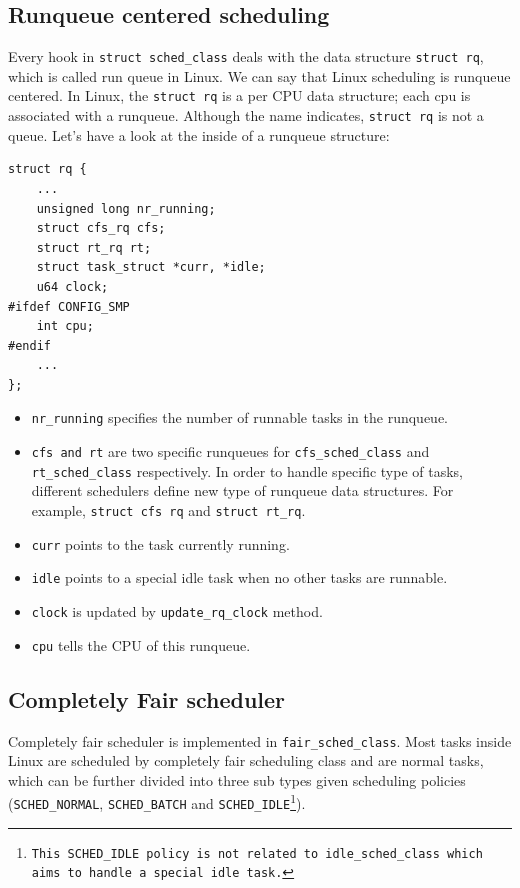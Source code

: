 \subsection{Runqueue centered scheduling\label{LinuxSched_rq}}
Every hook in \texttt{struct sched\_class} deals with the data structure 
\texttt{struct rq}, which is called run queue in Linux.  We can say that 
Linux scheduling is runqueue centered. In Linux, the \texttt{struct rq} is 
a per CPU data structure; each cpu is associated with a runqueue. Although 
the name indicates, \texttt{struct rq} is not a queue. Let's have a look at 
the inside of a runqueue structure:
\begin{lstlisting}
struct rq {
	...
	unsigned long nr_running;
	struct cfs_rq cfs;
	struct rt_rq rt;
	struct task_struct *curr, *idle;
	u64 clock;
#ifdef CONFIG_SMP
	int cpu;
#endif
	...
};
\end{lstlisting}
\begin{itemize}
\item \texttt{nr\_running} specifies the number of runnable tasks in the
	runqueue.
\item \texttt{cfs and rt} are two specific runqueues for 
	\texttt{cfs\_sched\_class} and \texttt{rt\_sched\_class} respectively. 
	In order to handle specific type of tasks, different schedulers define 
	new type of runqueue data structures. For example, \texttt{struct cfs 
	rq} and \texttt{struct rt\_rq}. 
\item \texttt{curr} points to the task currently running.
\item \texttt{idle} points to a special idle task when no other tasks are
	runnable.
\item \texttt{clock} is updated by \texttt{update\_rq\_clock} method.
\item \texttt{cpu} tells the CPU of this runqueue.
\end{itemize}

\subsection{Completely Fair scheduler\label{sec:LinuxSched_cfs}}
Completely fair scheduler is implemented in \texttt{fair\_sched\_class}. 
Most tasks inside Linux are scheduled by completely fair scheduling class
 and are normal tasks, which can be further divided into three sub 
types given scheduling policies (\texttt{SCHED\_NORMAL}, \texttt{SCHED\_BATCH}
and \texttt{SCHED\_IDLE\footnote{This SCHED\_IDLE policy is not related to
idle\_sched\_class which aims to handle a special idle task.}}).

